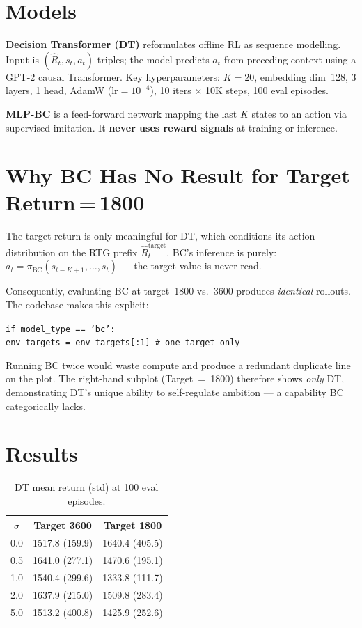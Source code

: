\documentclass[10pt,a4paper,twocolumn]{article}
\begin{document}
\section{Models}

\textbf{Decision Transformer (DT)} reformulates offline RL as sequence modelling.
Input is $(\hat{R}_t, s_t, a_t)$ triples; the model predicts $a_t$ from preceding
context using a GPT-2 causal Transformer.
Key hyperparameters: $K=20$, embedding dim~128, 3 layers, 1 head, AdamW
($\text{lr}=10^{-4}$), 10 iters $\times$ 10K steps, 100 eval episodes.

\textbf{MLP-BC} is a feed-forward network mapping the last $K$ states to an action
via supervised imitation. It \textbf{never uses reward signals} at training or
inference.

\section{Why BC Has No Result for Target Return\,=\,1800}

The target return is only meaningful for DT, which conditions its action distribution
on the RTG prefix $\hat{R}_t^{\text{target}}$. BC's inference is purely:
$a_t = \pi_{\text{BC}}(s_{t-K+1},\ldots,s_t)$ — the target value is never read.

Consequently, evaluating BC at target~1800 vs.\ 3600 produces \textit{identical}
rollouts. The codebase makes this explicit:

\smallskip
\noindent\texttt{if model\_type == 'bc':}\\
\hspace*{1em}\texttt{env\_targets = env\_targets[:1] \# one target only}
\smallskip

Running BC twice would waste compute and produce a redundant duplicate line on the
plot. The right-hand subplot (Target~=~1800) therefore shows \textit{only} DT,
demonstrating DT's unique ability to self-regulate ambition — a capability BC
categorically lacks.

\section{Results}

\begin{table}[H]
\centering\small
\caption{DT mean return (std) at 100 eval episodes.}
\begin{tabular}{ccc}
\toprule
$\sigma$ & Target 3600 & Target 1800 \\
\midrule
0.0 & 1517.8 (159.9) & 1640.4 (405.5)\\
0.5 & 1641.0 (277.1) & 1470.6 (195.1)\\
1.0 & 1540.4 (299.6) & 1333.8 (111.7)\\
2.0 & 1637.9 (215.0) & 1509.8 (283.4)\\
5.0 & 1513.2 (400.8) & 1425.9 (252.6)\\
\bottomrule
\end{tabular}
\end{table}
\end{document}
